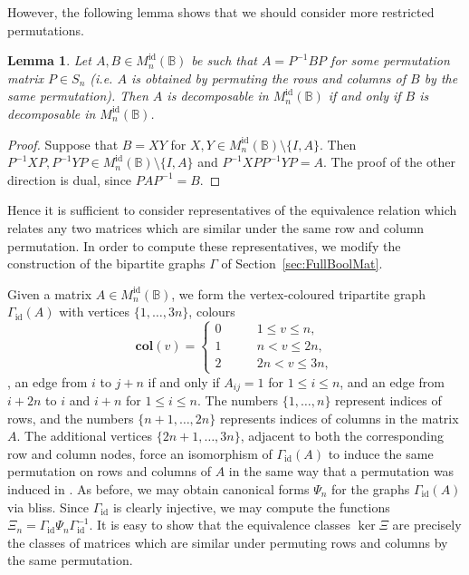 \documentclass[11pt]{article}
\newtheorem{lemma}[thm]{Lemma}
\numberwithin{equation}{section}
\newcommand{\B}{\mathbb{B}}
\newcommand{\Refn}{M_n^{\text{id}}(\B)}
\begin{document}
However, the following lemma shows that we should consider more restricted
permutations.

\begin{lemma}
  Let $A, B \in \Refn$ be such that $A = P^{-1} B P$ for some permutation matrix
  $P \in S_n$ (i.e. $A$ is obtained by permuting the rows and columns of $B$ by
  the same permutation). Then $A$ is decomposable in $\Refn$ if and only if $B$
  is decomposable in $\Refn$.
\end{lemma}
\begin{proof}
  Suppose that $B = XY$ for $X, Y \in \Refn\setminus \{I, A\}$. Then $P^{-1}XP,
  P^{-1}YP \in \Refn\setminus\{I, A\}$ and $P^{-1}XPP^{-1}YP = A$. The proof of
  the other direction is dual, since $PAP^{-1} = B$.
\end{proof}

Hence it is sufficient to consider representatives of the equivalence relation
which relates any two matrices which are similar under the same row and column
permutation. In order to compute these representatives, we modify the
construction of the bipartite graphs $\Gamma$ of Section~\ref{sec:FullBoolMat}.

Given a matrix $A \in \Refn$, we form the vertex-coloured tripartite graph
$\Gamma_\text{id}(A)$ with vertices $\{1, \ldots, 3n\}$, colours 
\[\mathbf{col}(v) = \begin{cases}
    0 \qquad &1 \leq v \leq n, \\
    1 \qquad &n < v \leq 2n, \\
    2 \qquad &2n < v \leq 3n,
  \end{cases}
\]
, an edge from $i$ to $j+n$ if and only if $A_{ij} = 1$ for $1 \leq i \leq n$,
and an edge from $i + 2n$ to $i$ and $i + n$ for $1 \leq i \leq n$. The numbers $\{1,
  \ldots, n\}$ represent indices of rows, and the numbers $\{n + 1, \ldots, 2n\}$
represents indices of columns in the matrix $A$. The additional vertices $\{2n +
  1, \ldots, 3n\}$, adjacent to both the corresponding row and column nodes,
force an isomorphism of $\Gamma_\text{id}(A)$ to induce the same permutation on rows and
columns of $A$ in the same way that a permutation was induced in
. As before, we may obtain canonical forms
$\Psi_n$ for the graphs $\Gamma_{\text{id}}(A)$ via bliss. Since
$\Gamma_\text{id}$ is clearly injective, we may compute the functions
$\Xi_n = \Gamma_\text{id}\Psi_n\Gamma_\text{id}^{-1}$. It is easy to show that
the equivalence classes $\ker\Xi$ are precisely the classes of matrices which
are similar under permuting rows and columns by the same permutation.
\end{document}
